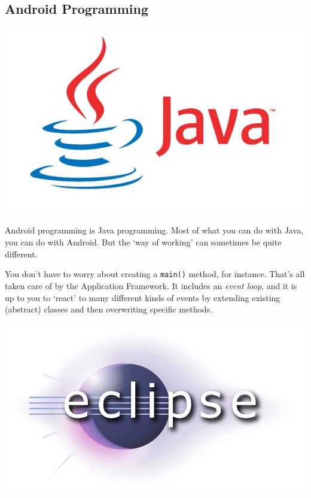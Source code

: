 \documentclass[a4paper,slides=slides,handouts=handouts]{mh-presentation}       %
\begin{document}
\subsection{Android Programming}
	
	\begin{slide}
		\includegraphics[scale=.4]{java.jpg}
	\end{slide}
	
	\begin{summary}
		Android programming is Java programming. Most of what you can do with Java, you can do
		with Android. But the `way of working' can sometimes be quite different.
		
		You don't have to worry about creating a \texttt{main()} method, for instance. That's
		all taken care of by the Application Framework. It includes an \emph{event loop}, and
		it is up to you to `react' to many different kinds of events by extending existing
		(abstract) classes and then overwriting specific methods.
	\end{summary}
	
	\begin{slide}
		\includegraphics[scale=.4]{eclipse.png}
	\end{slide}
	
\end{document}

